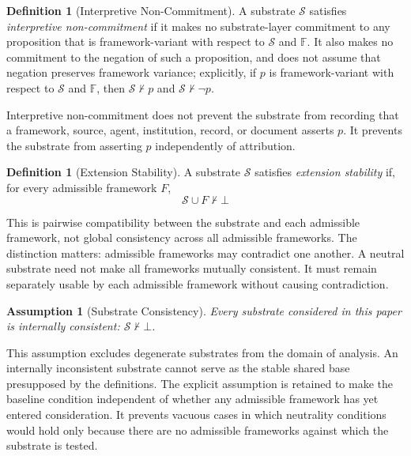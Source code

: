\documentclass[11pt]{article}
\theoremstyle{plain}
\newtheorem{assumption}[theorem]{Assumption}
\theoremstyle{definition}
\newtheorem{definition}[theorem]{Definition}
\theoremstyle{remark}
\newcommand{\Substrate}{\mathcal{S}}
\newcommand{\Frameworks}{\mathbb{F}}
\newcommand{\Framework}{F}
\newcommand{\notentails}{\nvdash}
\begin{document}
\begin{definition}[Interpretive Non-Commitment]
  \label{se100.def.InterpretiveNonCommitment}
  A substrate $\Substrate$ satisfies \emph{interpretive non-commitment} if it
  makes no substrate-layer commitment to any proposition that is
  framework-variant with respect to $\Substrate$ and $\Frameworks$.
  It also makes no commitment to the negation of such a proposition,
  and does not assume that negation preserves framework variance;
  explicitly, if
  $p$ is framework-variant with respect to $\Substrate$ and $\Frameworks$,
  then
  $\Substrate \notentails p$ and $\Substrate \notentails \neg p$.
\end{definition}

Interpretive non-commitment does not prevent the substrate from recording that
a framework, source, agent, institution, record, or document asserts $p$.
It prevents the substrate from asserting $p$ independently of attribution.

\begin{definition}[Extension Stability]
  \label{se100.def.ExtensionStability}
  A substrate $\Substrate$ satisfies \emph{extension stability} if, for every
  admissible framework $\Framework$,
  \[
    \Substrate \cup \Framework \notentails \bot
  \]
\end{definition}

This is pairwise compatibility between the substrate and each admissible
framework, not global consistency across all admissible frameworks.
The distinction matters: admissible frameworks may contradict one another.
A neutral substrate need not make all frameworks mutually consistent.
It must remain separately usable by each admissible framework without causing contradiction.


\begin{assumption}[Substrate Consistency]
  \label{se100.assump.SubstrateConsistency}
  Every substrate considered in this paper is internally consistent:
  $\Substrate \notentails \bot$.
\end{assumption}

This assumption excludes degenerate substrates from the domain of analysis.
An internally inconsistent substrate cannot serve as the stable shared base
presupposed by the definitions.
The explicit assumption is retained to make the baseline condition independent
of whether any admissible framework has yet entered consideration.
It prevents vacuous cases in which neutrality conditions would hold only
because there are no admissible frameworks against which the substrate is tested.
\end{document}
